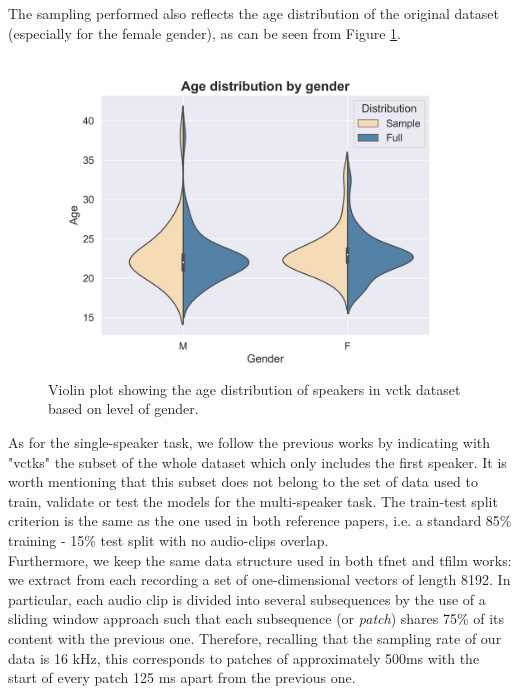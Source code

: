 The sampling performed also reflects the age distribution of the original dataset (especially for the female gender), as can be seen from Figure \ref{fig:age_dataset}. \\
\begin{figure}[H]
	\begin{center}
		\includegraphics[scale=0.6]{img/age_distribution_by_gender.png}
		\caption{Violin plot showing the age distribution of speakers in \gls{vctk} dataset based on level of gender.}
		\label{fig:age_dataset}
	\end{center}
\end{figure}
\noindent As for the single-speaker task, we follow the previous works \cite{lim2018time} by indicating with "\gls{vctk}s" the subset of the whole dataset which only includes the first speaker. It is worth mentioning that this subset does not belong to the set of data used to train, validate or test the models for the multi-speaker task. The train-test split criterion is the same as the one used in both reference papers, i.e. a standard 85\% training - 15\% test split with no audio-clips overlap. \\
Furthermore, we keep the same data structure used in both \gls{tfnet} and \gls{tfilm} works: we extract from each recording a set of one-dimensional vectors of length 8192. In particular, each audio clip is divided into several subsequences by the use of a sliding window approach such that each subsequence (or \textit{patch}) shares 75\% of its content with the previous one. Therefore, recalling that the sampling rate of our data is 16 kHz, this corresponds to patches of approximately 500ms with the start of every patch 125 ms apart from the previous one. \\
